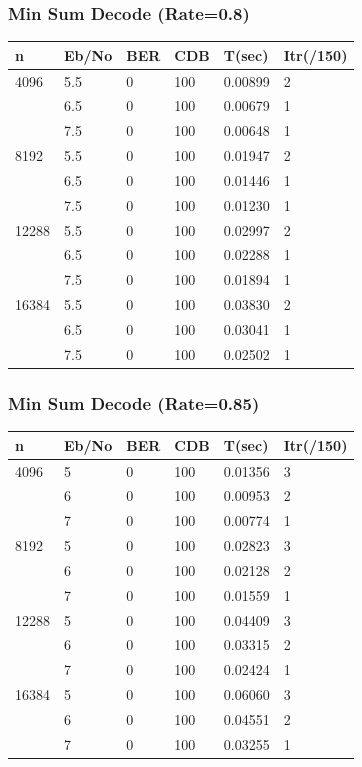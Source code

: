 \documentclass[xcolor=dvipsname]
{beamer}
\begin{document}
\begin{frame}[t] 
\frametitle{Min Sum Decode (Rate=0.8)}
\begin{table}[]
\label{my-label}
\begin{tabular}{|l|l|l|l|l|l|}
\hline
n     & Eb/No & BER & CDB & T(sec)  & Itr(/150) \\ \hline
4096  & 5.5   & 0   & 100 & 0.00899 & 2         \\
      & 6.5   & 0   & 100 & 0.00679 & 1         \\ 
      & 7.5   & 0   & 100 & 0.00648 & 1         \\ \hline
8192  & 5.5   & 0   & 100 & 0.01947 & 2         \\ 
      & 6.5   & 0   & 100 & 0.01446 & 1         \\ 
      & 7.5   & 0   & 100 & 0.01230 & 1         \\ \hline
12288 & 5.5   & 0   & 100 & 0.02997 & 2         \\ 
      & 6.5   & 0   & 100 & 0.02288 & 1         \\
      & 7.5   & 0   & 100 & 0.01894 & 1         \\ \hline
16384 & 5.5   & 0   & 100 & 0.03830 & 2         \\ 
      & 6.5   & 0   & 100 & 0.03041 & 1         \\ 
      & 7.5   & 0   & 100 & 0.02502 & 1         \\ \hline
\end{tabular}
\end{table}
\end{frame}

\begin{frame}[t] 
\frametitle{Min Sum Decode (Rate=0.85)}

\begin{table}[]
\centering
\begin{tabular}{|l|l|l|l|l|l|}
\hline
n     & Eb/No & BER & CDB & T(sec)  & Itr(/150) \\ \hline
4096  & 5     & 0   & 100 & 0.01356 & 3         \\
      & 6     & 0   & 100 & 0.00953 & 2         \\ 
      & 7     & 0   & 100 & 0.00774 & 1         \\ \hline
8192  & 5     & 0   & 100 & 0.02823 & 3         \\ 
      & 6     & 0   & 100 & 0.02128 & 2         \\ 
      & 7     & 0   & 100 & 0.01559 & 1         \\ \hline
12288 & 5     & 0   & 100 & 0.04409 & 3         \\ 
      & 6     & 0   & 100 & 0.03315 & 2         \\ 
      & 7     & 0   & 100 & 0.02424 & 1         \\ \hline
16384 & 5     & 0   & 100 & 0.06060 & 3         \\ 
      & 6     & 0   & 100 & 0.04551 & 2         \\ 
      & 7     & 0   & 100 & 0.03255 & 1         \\ \hline
\end{tabular}
\end{table}
\end{frame}
\end{document}
